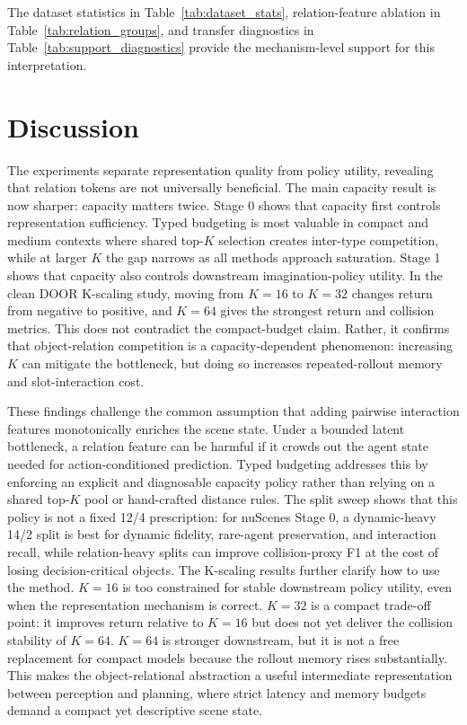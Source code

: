 \documentclass[10pt,journal,compsoc]{IEEEtran}
\begin{document}
The dataset statistics in Table~\ref{tab:dataset_stats}, relation-feature ablation in Table~\ref{tab:relation_groups}, and transfer diagnostics in Table~\ref{tab:support_diagnostics} provide the mechanism-level support for this interpretation.


\section{Discussion}
The experiments separate representation quality from policy utility, revealing that relation tokens are not universally beneficial. The main capacity result is now sharper: capacity matters twice. Stage 0 shows that capacity first controls representation sufficiency. Typed budgeting is most valuable in compact and medium contexts where shared top-$K$ selection creates inter-type competition, while at larger $K$ the gap narrows as all methods approach saturation. Stage 1 shows that capacity also controls downstream imagination-policy utility. In the clean DOOR K-scaling study, moving from $K=16$ to $K=32$ changes return from negative to positive, and $K=64$ gives the strongest return and collision metrics. This does not contradict the compact-budget claim. Rather, it confirms that object-relation competition is a capacity-dependent phenomenon: increasing $K$ can mitigate the bottleneck, but doing so increases repeated-rollout memory and slot-interaction cost.

These findings challenge the common assumption that adding pairwise interaction features monotonically enriches the scene state. Under a bounded latent bottleneck, a relation feature can be harmful if it crowds out the agent state needed for action-conditioned prediction. Typed budgeting addresses this by enforcing an explicit and diagnosable capacity policy rather than relying on a shared top-$K$ pool or hand-crafted distance rules. The split sweep shows that this policy is not a fixed 12/4 prescription: for nuScenes Stage 0, a dynamic-heavy 14/2 split is best for dynamic fidelity, rare-agent preservation, and interaction recall, while relation-heavy splits can improve collision-proxy F1 at the cost of losing decision-critical objects. The K-scaling results further clarify how to use the method. $K=16$ is too constrained for stable downstream policy utility, even when the representation mechanism is correct. $K=32$ is a compact trade-off point: it improves return relative to $K=16$ but does not yet deliver the collision stability of $K=64$. $K=64$ is stronger downstream, but it is not a free replacement for compact models because the rollout memory rises substantially. This makes the object-relational abstraction a useful intermediate representation between perception and planning, where strict latency and memory budgets demand a compact yet descriptive scene state.
\end{document}

